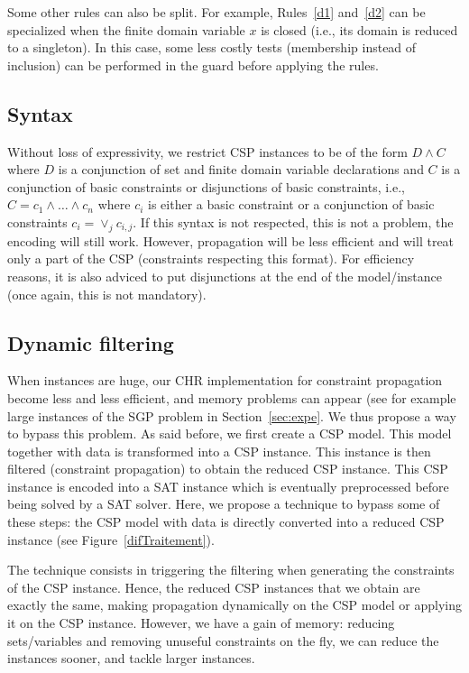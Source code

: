 \documentclass[3p,authoryear,times]{elsarticle}
\begin{document}
\medskip

Some other rules can also be split. For example, Rules~\ref{d1} and~\ref{d2} can be specialized when the finite domain variable $x$ is closed (i.e., its domain is reduced to a singleton). In this case, some less costly tests (membership instead of inclusion) can be performed in the guard before applying the rules.

\subsection{Syntax}
Without loss of expressivity, we restrict CSP instances to be of the form $D \wedge C$ where $D$ is a conjunction of set and finite domain variable declarations and $C$ is a conjunction of basic constraints or disjunctions of basic constraints, i.e., $C=c_1\wedge \ldots \wedge c_n$ where $c_i$ is either a basic constraint or a conjunction of basic constraints $c_i=\vee_j c_{i,j}$. If this syntax is not respected, this is not a problem, the encoding will still work. However, propagation will be less efficient and will treat only a part of the CSP (constraints respecting this format). For efficiency reasons, it is also adviced to put disjunctions at the end of the model/instance (once again, this is not mandatory).


\subsection{Dynamic filtering}
\label{dynamic_filtering}
When instances are huge, our CHR implementation for constraint propagation become less and less efficient, and memory problems can appear (see for example large instances of the SGP problem in Section~\ref{sec:expe}. We thus propose a way to bypass this problem.
As said before, we first create a CSP model. This model together with data is transformed into a CSP instance. This instance is then filtered (constraint propagation) to obtain the reduced CSP instance. This CSP instance is encoded into a SAT instance which is eventually preprocessed before being solved by a SAT solver. Here, we propose a technique to bypass some of these steps: the CSP model with data is directly converted into a reduced CSP instance (see Figure~\ref{difTraitement}). 

The technique consists in triggering the filtering when generating the constraints of the CSP instance. Hence, the  reduced CSP instances that we obtain are exactly the same, making propagation dynamically on the CSP model or applying it on the CSP instance. However, we have a gain of memory: reducing sets/variables and removing unuseful constraints on the fly, we can reduce the instances sooner, and tackle larger instances. 
\end{document}
